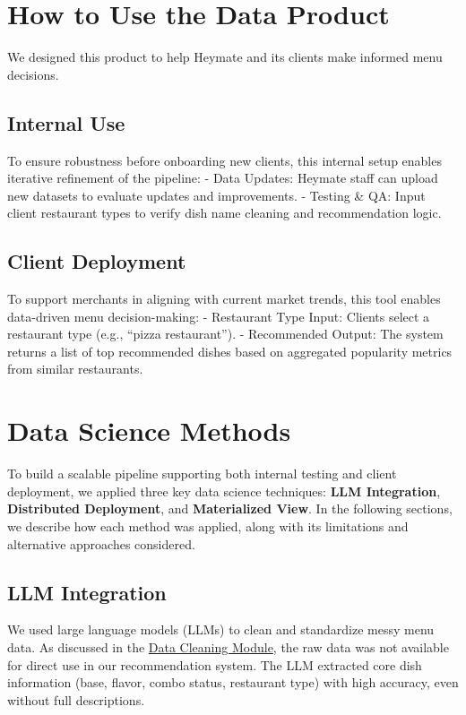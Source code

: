 \documentclass[
  11pt,
  a4paper,
  DIV=11,
  numbers=noendperiod]{scrartcl}
\begin{document}
\section{How to Use the Data Product}\label{how-to-use-the-data-product}

We designed this product to help Heymate and its clients make informed
menu decisions.

\subsection{Internal Use}\label{internal-use}

To ensure robustness before onboarding new clients, this internal setup
enables iterative refinement of the pipeline: - Data Updates: Heymate
staff can upload new datasets to evaluate updates and improvements. -
Testing \& QA: Input client restaurant types to verify dish name
cleaning and recommendation logic.

\subsection{Client Deployment}\label{client-deployment}

To support merchants in aligning with current market trends, this tool
enables data-driven menu decision-making: - Restaurant Type Input:
Clients select a restaurant type (e.g., ``pizza restaurant''). -
Recommended Output: The system returns a list of top recommended dishes
based on aggregated popularity metrics from similar restaurants.

\section{Data Science Methods}\label{data-science-methods}

To build a scalable pipeline supporting both internal testing and client
deployment, we applied three key data science techniques: \textbf{LLM
Integration}, \textbf{Distributed Deployment}, and \textbf{Materialized
View}. In the following sections, we describe how each method was
applied, along with its limitations and alternative approaches
considered.

\subsection{LLM Integration}\label{llm-integration}

We used large language models (LLMs) to clean and standardize messy menu
data. As discussed in the \hyperref[data-cleaning-module]{Data Cleaning
Module}, the raw data was not available for direct use in our
recommendation system. The LLM extracted core dish information (base,
flavor, combo status, restaurant type) with high accuracy, even without
full descriptions.
\end{document}
